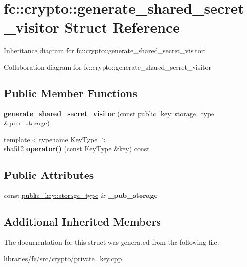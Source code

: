 \hypertarget{structfc_1_1crypto_1_1generate__shared__secret__visitor}{}\section{fc\+:\+:crypto\+:\+:generate\+\_\+shared\+\_\+secret\+\_\+visitor Struct Reference}
\label{structfc_1_1crypto_1_1generate__shared__secret__visitor}


Inheritance diagram for fc\+:\+:crypto\+:\+:generate\+\_\+shared\+\_\+secret\+\_\+visitor\+:


Collaboration diagram for fc\+:\+:crypto\+:\+:generate\+\_\+shared\+\_\+secret\+\_\+visitor\+:
\subsection*{Public Member Functions}
\begin{DoxyCompactItemize}
\item 
\mbox{\label{structfc_1_1crypto_1_1generate__shared__secret__visitor_a07475effaa124688daf3402f4d020f1f}} 
{\bfseries generate\+\_\+shared\+\_\+secret\+\_\+visitor} (const \mbox{\hyperlink{classfc_1_1static__variant}{public\+\_\+key\+::storage\+\_\+type}} \&pub\+\_\+storage)
\item 
\mbox{\label{structfc_1_1crypto_1_1generate__shared__secret__visitor_aa46c1b0a3337748d8918b3e3232900c1}} 
{\footnotesize template$<$typename Key\+Type $>$ }\\\mbox{\hyperlink{classfc_1_1sha512}{sha512}} {\bfseries operator()} (const Key\+Type \&key) const
\end{DoxyCompactItemize}
\subsection*{Public Attributes}
\begin{DoxyCompactItemize}
\item 
\mbox{\label{structfc_1_1crypto_1_1generate__shared__secret__visitor_a0c794f610ea57cbb9f8d2a15890a402e}} 
const \mbox{\hyperlink{classfc_1_1static__variant}{public\+\_\+key\+::storage\+\_\+type}} \& {\bfseries \+\_\+pub\+\_\+storage}
\end{DoxyCompactItemize}
\subsection*{Additional Inherited Members}


The documentation for this struct was generated from the following file\+:\begin{DoxyCompactItemize}
\item 
libraries/fc/src/crypto/private\+\_\+key.\+cpp\end{DoxyCompactItemize}
